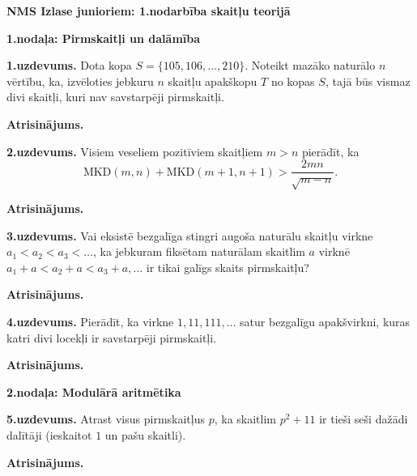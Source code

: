 \documentclass[11pt]{article}
\begin{document}
\begin{center}
{\Large \bf NMS Izlase junioriem: 1.nodarbība skaitļu teorijā}
\end{center}

\vspace{10pt}
{\bf \large 1.nodaļa: Pirmskaitļi un dalāmība}

\vspace{10pt}
{\footnotesize
{\bf 1.uzdevums.} Dota kopa $S = \{ 105,106,\ldots,210 \}$. Noteikt mazāko 
naturālo $n$ vērtību, ka, izvēloties jebkuru $n$ skaitļu 
apakškopu $T$ no kopas $S$, tajā būs vismaz divi skaitļi, kuri nav 
savstarpēji pirmskaitļi. 
}

\vspace{6pt}
{\bf Atrisinājums.} 


\vspace{10pt}
{\footnotesize
{\bf 2.uzdevums.}
Visiem veseliem pozitīviem skaitļiem $m > n$ pierādīt, ka 
$$\mbox{MKD}(m,n) + \mbox{MKD}(m+1,n+1) > \frac{2mn}{\sqrt{m-n}}.$$
}

\vspace{6pt}
{\bf Atrisinājums.} 



\vspace{10pt}
{\footnotesize
{\bf 3.uzdevums.}
Vai eksistē bezgalīga 
stingri augoša naturālu skaitļu virkne $a_1 < a_2 < a_3 <\ldots$, 
ka jebkuram fiksētam naturālam skaitlim $a$ virknē $a_1+a < a_2+a < a_3 + a,\ldots$ 
ir tikai galīgs skaits pirmskaitļu? 
}

\vspace{6pt}
{\bf Atrisinājums.} 


\vspace{10pt}
{\footnotesize
{\bf 4.uzdevums.}
Pierādīt, ka virkne $1,11,111,\ldots$ satur bezgalīgu apakšvirkni, 
kuras katri divi locekļi ir savstarpēji pirmskaitļi.
}

\vspace{6pt}
{\bf Atrisinājums.} 




\vspace{30pt}
{\bf \large 2.nodaļa: Modulārā aritmētika}


\vspace{10pt}
{\footnotesize
{\bf 5.uzdevums.}
Atrast visus pirmskaitļus $p$, ka skaitlim $p^2 + 11$ ir tieši 
seši dažādi dalītāji (ieskaitot $1$ un pašu skaitli).
}

\vspace{6pt}
{\bf Atrisinājums.} 
\end{document}
